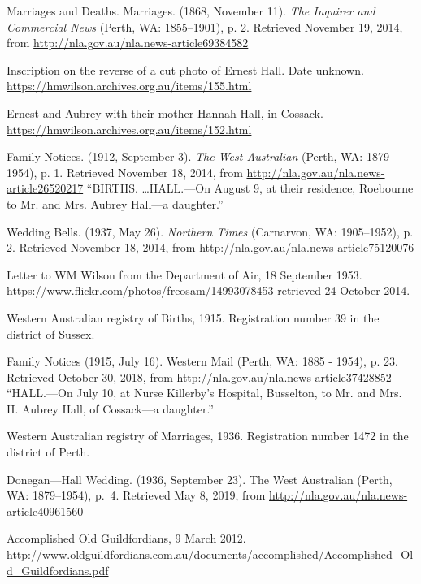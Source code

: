 \begin{thebibliography}{999}
	Marriages and Deaths. Marriages. (1868, November 11).
	\emph{The Inquirer and Commercial News} (Perth, WA: 1855--1901), p. 2.
	Retrieved November 19, 2014, from \url{http://nla.gov.au/nla.news-article69384582}

	Inscription on the reverse of a cut photo of Ernest Hall. Date unknown.
	\url{https://hmwilson.archives.org.au/items/155.html}

	Ernest and Aubrey with their mother Hannah Hall, in Cossack.
	\url{https://hmwilson.archives.org.au/items/152.html}

	Family Notices. (1912, September 3). \emph{The West Australian} (Perth, WA: 1879--1954), p. 1.
	Retrieved November 18, 2014, from \url{http://nla.gov.au/nla.news-article26520217}
	``BIRTHS. \dots HALL.---On August 9, at their residence, Roebourne to Mr. and Mrs. Aubrey Hall---a daughter.''

	Wedding Bells. (1937, May 26). \emph{Northern Times} (Carnarvon, WA: 1905--1952), p. 2.
	Retrieved November 18, 2014, from \url{http://nla.gov.au/nla.news-article75120076}

	Letter to WM Wilson from the Department of Air, 18 September 1953.
	\url{https://www.flickr.com/photos/freosam/14993078453} retrieved 24 October 2014.

	Western Australian registry of Births, 1915. Registration number 39 in the district of Sussex.

	Family Notices (1915, July 16). Western Mail (Perth, WA: 1885 - 1954), p. 23. Retrieved October 30, 2018, from \url{http://nla.gov.au/nla.news-article37428852}
	``HALL.---On July 10, at Nurse Killerby's Hospital, Busselton, to Mr. and Mrs. H. Aubrey Hall, of Cossack---a daughter.''

	Western Australian registry of Marriages, 1936. Registration number 1472 in the district of Perth.

	Donegan---Hall Wedding. (1936, September 23). The West Australian (Perth, WA: 1879--1954), p.\ 4.
	Retrieved May 8, 2019, from \url{http://nla.gov.au/nla.news-article40961560}

	Accomplished Old Guildfordians, 9 March 2012.
	\url{http://www.oldguildfordians.com.au/documents/accomplished/Accomplished_Old_Guildfordians.pdf}


\end{thebibliography}
